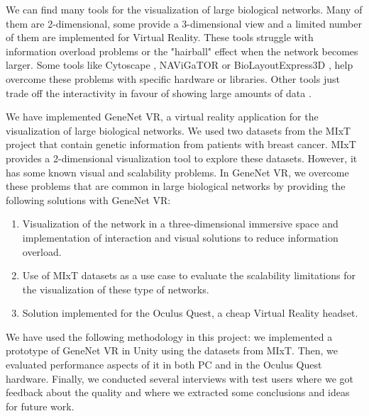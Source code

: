 
We can find many tools for the visualization of large biological networks. Many of them are 2-dimensional, some provide a 3-dimensional view and a limited number of them are implemented for Virtual Reality. These tools struggle with information overload problems or the "hairball" effect when the network becomes larger. Some tools like Cytoscape \cite{cytoscape}, NAViGaTOR \cite{navigator} or BioLayoutExpress3D \cite{biolayout3d}, help overcome these problems with specific hardware or libraries. Other tools just trade off the interactivity in favour of showing large amounts of data \cite{agapito_guzzi_cannataro_2013}.




We have implemented GeneNet VR, a virtual reality application for the visualization of large biological networks. We used two datasets from the MIxT project \cite{dumeaux_fjukstad_interactions_tumor_blood} that contain genetic information from patients with breast cancer. MIxT provides a 2-dimensional visualization tool to explore these datasets. However, it has some known visual and scalability problems. In GeneNet VR, we overcome these problems that are common in large biological networks by providing the following solutions with GeneNet VR:
\begin{enumerate}
  \item Visualization of the network in a three-dimensional immersive space and implementation of interaction and visual solutions to reduce information overload.
  \item Use of MIxT datasets as a use case to evaluate the scalability limitations for the visualization of these type of networks.
  \item Solution implemented for the Oculus Quest, a cheap Virtual Reality headset.
\end{enumerate}

We have used the following methodology in this project: we implemented a prototype of GeneNet VR in Unity using the datasets from MIxT. Then, we evaluated performance aspects of it in both PC and in the Oculus Quest hardware. Finally, we conducted several interviews with test users where we got feedback about the quality and where we extracted some conclusions and ideas for future work.

